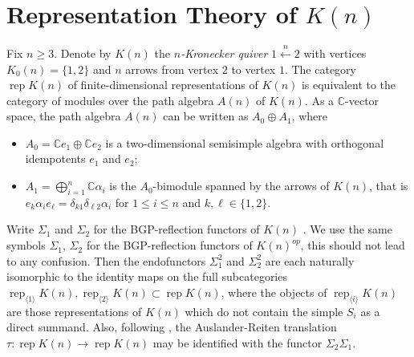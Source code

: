 \documentclass{amsart}
\newcommand{\rep}{\operatorname{rep}}
\newcommand{\CC}{\mathbb{C}}
\begin{document}
\section{Representation Theory of $K(n)$}\label{sec:RepK(n)}

Fix $n\ge3$. Denote by $K(n)$ the \emph{$n$-Kronecker quiver} $1\stackrel{n}{\longleftarrow}2$ with vertices $K_0(n)=\{1,2\}$ and $n$ arrows from vertex $2$ to vertex $1$. 
The category $\rep K(n)$ of finite-dimensional representations of $K(n)$ is equivalent to the category of modules over the path algebra $A(n)$ of $K(n)$.
As a $\CC$-vector space, the path algebra $A(n)$ can be written as $A_0\oplus A_1$, where 
\begin{itemize}
  \item $A_0=\CC e_1\oplus \CC e_2$ is a two-dimensional semisimple algebra with orthogonal idempotents $e_1$ and $e_2$;
  \item $A_1=\bigoplus_{i=1}^n \CC\alpha_i$ is the $A_0$-bimodule spanned by the arrows of $K(n)$, that is $e_k\alpha_ie_\ell=\delta_{k1}\delta_{\ell2}\alpha_i$ for $1\le i\le n$ and $k,\ell\in\{1,2\}$.
\end{itemize}

Write $\Sigma_1$ and $\Sigma_2$ for the BGP-reflection functors of $K(n)$ \cite{bgp}. 
We use the same symbols $\Sigma_1$, $\Sigma_2$ for the BGP-reflection functors of $K(n)^{op}$, this should not lead to any confusion. 
Then the endofunctors $\Sigma_1^2$ and $\Sigma_2^2$ are each naturally isomorphic to the identity maps on the full subcategories $\rep_{\langle 1\rangle} K(n),\rep_{\langle 2\rangle} K(n)\subset \rep K(n)$, where the objects of $\rep_{\langle i\rangle} K(n)$ are those representations of $K(n)$ which do not contain the simple $S_i$ as a direct summand.
Also, following \cite{brenner-butler}, the Auslander-Reiten translation $\tau:\rep K(n)\to\rep K(n)$ may be identified with the functor $\Sigma_2\Sigma_1$.
\end{document}
